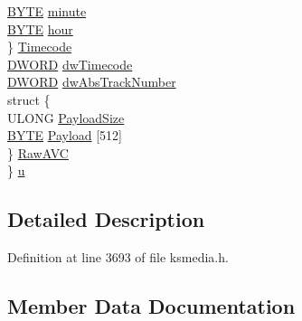 \begin{DoxyCompactItemize}
\begin{tabbing}
\>\>\hyperlink{mapinls_8h_a4ae1dab0fb4b072a66584546209e7d58}{BYTE} \hyperlink{struct_k_s_p_r_o_p_e_r_t_y___e_x_t_x_p_o_r_t___s_a08d46e1cf804dc226d41a06342d34095}{minute}\\
\>\>\hyperlink{mapinls_8h_a4ae1dab0fb4b072a66584546209e7d58}{BYTE} \hyperlink{struct_k_s_p_r_o_p_e_r_t_y___e_x_t_x_p_o_r_t___s_a0c998aed78b29b8aefbe526522adfa46}{hour}\\
\>\} \hyperlink{struct_k_s_p_r_o_p_e_r_t_y___e_x_t_x_p_o_r_t___s_a152b9945e0a8dcc391c77c2fc32ff876}{Timecode}\\
\>\hyperlink{mapinls_8h_ad342ac907eb044443153a22f964bf0af}{DWORD} \hyperlink{struct_k_s_p_r_o_p_e_r_t_y___e_x_t_x_p_o_r_t___s_ac6041f4d0e74c8b56fe5ea2ca4dfe4fa}{dwTimecode}\\
\>\hyperlink{mapinls_8h_ad342ac907eb044443153a22f964bf0af}{DWORD} \hyperlink{struct_k_s_p_r_o_p_e_r_t_y___e_x_t_x_p_o_r_t___s_a01c16694aa538406ae38099593f9e8b7}{dwAbsTrackNumber}\\
\>struct \{\\
\>\>ULONG \hyperlink{struct_k_s_p_r_o_p_e_r_t_y___e_x_t_x_p_o_r_t___s_ac9ca027d3f09ffff784f2e396e40e9a8}{PayloadSize}\\
\>\>\hyperlink{mapinls_8h_a4ae1dab0fb4b072a66584546209e7d58}{BYTE} \hyperlink{struct_k_s_p_r_o_p_e_r_t_y___e_x_t_x_p_o_r_t___s_a63764fa03e31ade61ccd11d70086a980}{Payload} \mbox{[}512\mbox{]}\\
\>\} \hyperlink{struct_k_s_p_r_o_p_e_r_t_y___e_x_t_x_p_o_r_t___s_aa9ff2b43eae237f59ca655d21858669e}{RawAVC}\\
\} \hyperlink{struct_k_s_p_r_o_p_e_r_t_y___e_x_t_x_p_o_r_t___s_a33132f25b599e8475388074be337fc1e}{u}\\

\end{tabbing}\end{DoxyCompactItemize}


\subsection{Detailed Description}


Definition at line 3693 of file ksmedia.\+h.



\subsection{Member Data Documentation}
